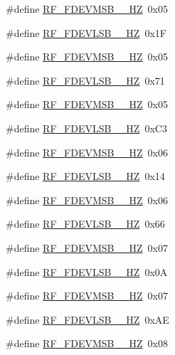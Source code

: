 \begin{DoxyCompactItemize}
\item 
\#define \hyperlink{sx1276Regs-Fsk_8h_af8cf1be1a66c7f6f63c4c73a2603657a}{R\+F\+\_\+\+F\+D\+E\+V\+M\+S\+B\+\_\+\_\+\+HZ}~0x05
\item 
\#define \hyperlink{sx1276Regs-Fsk_8h_a28c9def64a8f7e81619124df236fb932}{R\+F\+\_\+\+F\+D\+E\+V\+L\+S\+B\+\_\+\_\+\+HZ}~0x1F
\item 
\#define \hyperlink{sx1276Regs-Fsk_8h_a357181556a2104789f589fa736b3fbad}{R\+F\+\_\+\+F\+D\+E\+V\+M\+S\+B\+\_\+\_\+\+HZ}~0x05
\item 
\#define \hyperlink{sx1276Regs-Fsk_8h_abd3148b49d4c38af8373bd6915742f61}{R\+F\+\_\+\+F\+D\+E\+V\+L\+S\+B\+\_\+\_\+\+HZ}~0x71
\item 
\#define \hyperlink{sx1276Regs-Fsk_8h_a61741067e7b6adeb71872ead6d569729}{R\+F\+\_\+\+F\+D\+E\+V\+M\+S\+B\+\_\+\_\+\+HZ}~0x05
\item 
\#define \hyperlink{sx1276Regs-Fsk_8h_a7b621f874a4cde1cff39524f75238242}{R\+F\+\_\+\+F\+D\+E\+V\+L\+S\+B\+\_\+\_\+\+HZ}~0x\+C3
\item 
\#define \hyperlink{sx1276Regs-Fsk_8h_aac385ea95089fd15f02ee9c6ae3f544b}{R\+F\+\_\+\+F\+D\+E\+V\+M\+S\+B\+\_\+\_\+\+HZ}~0x06
\item 
\#define \hyperlink{sx1276Regs-Fsk_8h_a4a3332dcc3410ea042aefd3ea508747c}{R\+F\+\_\+\+F\+D\+E\+V\+L\+S\+B\+\_\+\_\+\+HZ}~0x14
\item 
\#define \hyperlink{sx1276Regs-Fsk_8h_a7f10de16347c046343a2290d5b4b9746}{R\+F\+\_\+\+F\+D\+E\+V\+M\+S\+B\+\_\+\_\+\+HZ}~0x06
\item 
\#define \hyperlink{sx1276Regs-Fsk_8h_ad5473d95050cf0c240839957bf60cec6}{R\+F\+\_\+\+F\+D\+E\+V\+L\+S\+B\+\_\+\_\+\+HZ}~0x66
\item 
\#define \hyperlink{sx1276Regs-Fsk_8h_a12c35c728c8d629f7295578c715b79a8}{R\+F\+\_\+\+F\+D\+E\+V\+M\+S\+B\+\_\+\_\+\+HZ}~0x07
\item 
\#define \hyperlink{sx1276Regs-Fsk_8h_a4eba5e680962adb0864eb8635768fdc6}{R\+F\+\_\+\+F\+D\+E\+V\+L\+S\+B\+\_\+\_\+\+HZ}~0x0A
\item 
\#define \hyperlink{sx1276Regs-Fsk_8h_a37ae271366c80441c6d8c2f1e35ea29c}{R\+F\+\_\+\+F\+D\+E\+V\+M\+S\+B\+\_\+\_\+\+HZ}~0x07
\item 
\#define \hyperlink{sx1276Regs-Fsk_8h_ab5e21d861dfe48c74e13672bfaa53fe1}{R\+F\+\_\+\+F\+D\+E\+V\+L\+S\+B\+\_\+\_\+\+HZ}~0x\+AE
\item 
\#define \hyperlink{sx1276Regs-Fsk_8h_a63df078ca72c89cfb75b17b10c3b945a}{R\+F\+\_\+\+F\+D\+E\+V\+M\+S\+B\+\_\+\_\+\+HZ}~0x08

\end{DoxyCompactItemize}
